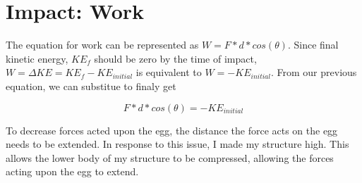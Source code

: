 \documentclass[12pt]{report}
\begin{document}
\section{Impact: Work}
The equation for work can be represented as $W = F*d*cos(\theta)$. Since final kinetic energy, $KE_f$ should be zero by the time of impact, $W = \Delta KE = KE_{f}-KE_{initial}$ is equivalent to $W = -KE_{initial}$. From our previous equation, we can substitue to finaly get

\begin{equation} \label{eq:7}
F*d*cos(\theta) = -KE_{initial}
\end{equation}

To decrease forces acted upon the egg, the distance the force acts on the egg needs to be extended. In response to this issue, I made my structure high. This allows the lower body of my structure to be compressed, allowing the forces acting upon the egg to extend.

%
\end{document}
